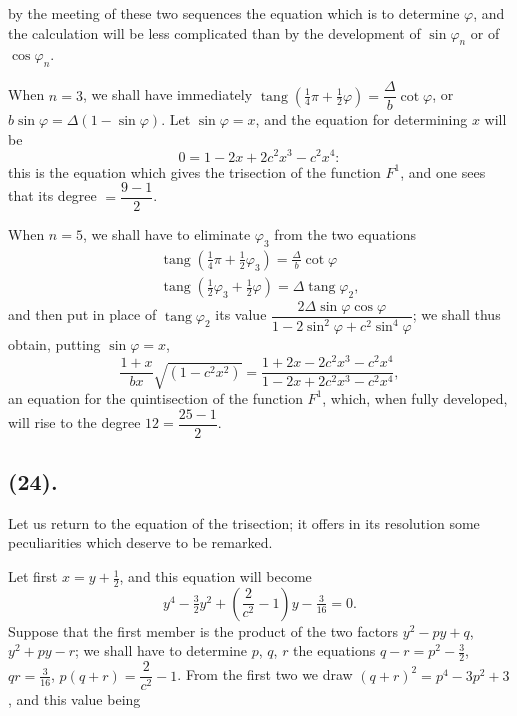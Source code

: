 \documentclass{article}
\begin{document}
by the meeting of these two sequences the equation which is to determine $\varphi$, and the calculation will be less complicated than by the development of $\sin\varphi_{n}$ or of $\cos\varphi_{n}$.

When $n=3$, we shall have immediately $\operatorname{tang}(\frac{1}{4}\pi+\frac{1}{2}\varphi)=\dfrac{\Delta}{b}\cot\varphi$, or $b\sin\varphi=\Delta(1-\sin\varphi)$. Let $\sin\varphi=x$, and the equation for determining $x$ will be
\[ 0=1-2x+2c^{2}x^{3}-c^{2}x^{4}: \]
this is the equation which gives the trisection of the function $F^{1}$, and one sees that its degree $=\dfrac{9-1}{2}$.

When $n=5$, we shall have to eliminate $\varphi_{3}$ from the two equations
\[ \begin{gathered} \operatorname{tang}(\tfrac{1}{4}\pi+\tfrac{1}{2}\varphi_{3})=\frac{\Delta}{b}\cot\varphi \\ \operatorname{tang}(\tfrac{1}{2}\varphi_{3}+\tfrac{1}{2}\varphi)=\Delta\operatorname{tang}\varphi_{2}, \end{gathered} \]
and then put in place of $\operatorname{tang}\varphi_{2}$ its value $\dfrac{2\Delta\sin\varphi\cos\varphi}{1-2\sin^{2}\varphi+c^{2}\sin^{4}\varphi}$; we shall thus obtain, putting $\sin\varphi=x$,
\[ \frac{1+x}{bx}\sqrt{(1-c^{2}x^{2})}=\frac{1+2x-2c^{2}x^{3}-c^{2}x^{4}}{1-2x+2c^{2}x^{3}-c^{2}x^{4}}, \]
an equation for the quintisection of the function $F^{1}$, which, when fully developed, will rise to the degree $12=\dfrac{25-1}{2}$.

\subsection*{(24).}

Let us return to the equation of the trisection; it offers in its resolution some peculiarities which deserve to be remarked.

Let first $x=y+\frac{1}{2}$, and this equation will become
\[ y^{4}-\tfrac{3}{2}y^{2}+\left(\frac{2}{c^{2}}-1\right)y-\tfrac{3}{16}=0. \]
Suppose that the first member is the product of the two factors $y^{2}-py+q$, $y^{2}+py-r$; we shall have to determine $p$, $q$, $r$ the equations $q-r=p^{2}-\frac{3}{2}$, $qr=\frac{3}{16}$, $p(q+r)=\dfrac{2}{c^{2}}-1$. From the first two we draw $(q+r)^{2}=p^{4}-3p^{2}+3$, and this value being
\end{document}
